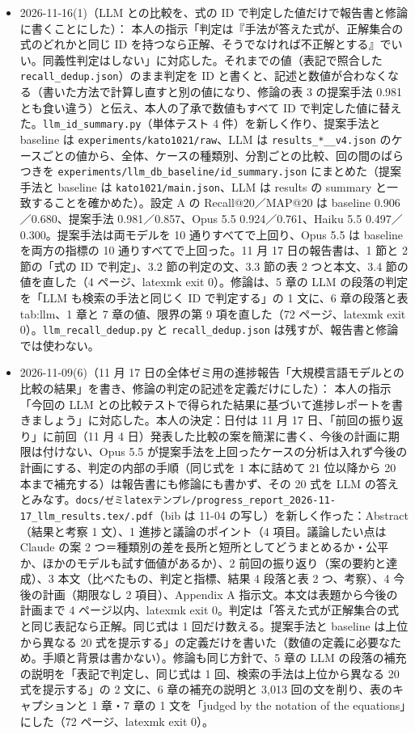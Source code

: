 \documentclass[11pt,a4paper]{jsarticle}
\begin{document}
\begin{itemize}[nosep]
  \item 2026-11-16(1)（LLM との比較を、式の ID で判定した値だけで報告書と修論に書くことにした）：
    本人の指示「判定は『手法が答えた式が、正解集合の式のどれかと同じ ID を持つなら正解、そうでなければ不正解とする』でいい。同義性判定はしない」に対応した。それまでの値（表記で照合した \texttt{recall\_dedup.json}）のまま判定を ID と書くと、記述と数値が合わなくなる（書いた方法で計算し直すと別の値になり、修論の表 3 の提案手法 0.981 とも食い違う）と伝え、本人の了承で数値もすべて ID で判定した値に替えた。\texttt{llm\_id\_summary.py}（単体テスト 4 件）を新しく作り、提案手法と baseline は \texttt{experiments/kato1021/raw}、LLM は \texttt{results\_*\_\_v4.json} のケースごとの値から、全体、ケースの種類別、分割ごとの比較、回の間のばらつきを \texttt{experiments/llm\_db\_baseline/id\_summary.json} にまとめた（提案手法と baseline は \texttt{kato1021/main.json}、LLM は results の summary と一致することを確かめた）。設定 A の Recall@20／MAP@20 は baseline 0.906／0.680、提案手法 0.981／0.857、Opus 5.5 0.924／0.761、Haiku 5.5 0.497／0.300。提案手法は両モデルを 10 通りすべてで上回り、Opus 5.5 は baseline を両方の指標の 10 通りすべてで上回った。11 月 17 日の報告書は、1 節と 2 節の「式の ID で判定」、3.2 節の判定の文、3.3 節の表 2 つと本文、3.4 節の値を直した（4 ページ、latexmk exit 0）。修論は、5 章の LLM の段落の判定を「LLM も検索の手法と同じく ID で判定する」の 1 文に、6 章の段落と表 tab:llm、1 章と 7 章の値、限界の第 9 項を直した（72 ページ、latexmk exit 0）。\texttt{llm\_recall\_dedup.py} と \texttt{recall\_dedup.json} は残すが、報告書と修論では使わない。
  \item 2026-11-09(6)（11 月 17 日の全体ゼミ用の進捗報告「大規模言語モデルとの比較の結果」を書き、修論の判定の記述を定義だけにした）：
    本人の指示「今回の LLM との比較テストで得られた結果に基づいて進捗レポートを書きましょう」に対応した。本人の決定：日付は 11 月 17 日、「前回の振り返り」に前回（11 月 4 日）発表した比較の案を簡潔に書く、今後の計画に期限は付けない、Opus 5.5 が提案手法を上回ったケースの分析は入れず今後の計画にする、判定の内部の手順（同じ式を 1 本に詰めて 21 位以降から 20 本まで補充する）は報告書にも修論にも書かず、その 20 式を LLM の答えとみなす。\texttt{docs/ゼミlatexテンプレ/progress\_report\_2026-11-17\_llm\_results.tex/.pdf}（bib は 11-04 の写し）を新しく作った：Abstract（結果と考察 1 文）、1 進捗と議論のポイント（4 項目。議論したい点は Claude の案 2 つ＝種類別の差を長所と短所としてどうまとめるか・公平か、ほかのモデルも試す価値があるか）、2 前回の振り返り（案の要約と達成）、3 本文（比べたもの、判定と指標、結果 4 段落と表 2 つ、考察）、4 今後の計画（期限なし 2 項目）、Appendix A 指示文。本文は表題から今後の計画まで 4 ページ以内、latexmk exit 0。判定は「答えた式が正解集合の式と同じ表記なら正解。同じ式は 1 回だけ数える。提案手法と baseline は上位から異なる 20 式を提示する」の定義だけを書いた（数値の定義に必要なため。手順と背景は書かない）。修論も同じ方針で、5 章の LLM の段落の補充の説明を「表記で判定し、同じ式は 1 回、検索の手法は上位から異なる 20 式を提示する」の 2 文に、6 章の補充の説明と 3,013 回の文を削り、表のキャプションと 1 章・7 章の 1 文を「judged by the notation of the equations」にした（72 ページ、latexmk exit 0）。

\end{itemize}
\end{document}
